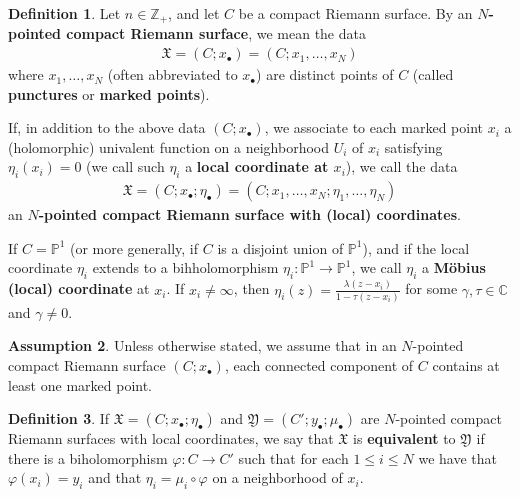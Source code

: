 \documentclass[11pt,b5paper,notitlepage]{article}
\theoremstyle{definition}
\newtheorem{df}{Definition}[section]
\newtheorem{ass}[df]{Assumption}
\theoremstyle{plain}
\newcommand{\fk}{\mathfrak}
\newcommand{\blt}{\bullet}
\newcommand{\Cbb}{\mathbb C}
\newcommand{\Zbb}{\mathbb Z}
\newcommand{\Pbb}{\mathbb P}
\numberwithin{equation}{section}
\begin{document}
\begin{df}
Let $n\in\Zbb_+$, and let $C$ be a compact Riemann surface. By an \textbf{$N$-pointed compact Riemann surface}, we mean the data
\begin{align*}
\fk X=(C;x_\blt)=(C;x_1,\dots,x_N)
\end{align*}
where $x_1,\dots,x_N$ (often abbreviated to $x_\blt$) are distinct points of $C$ (called \textbf{punctures} or \textbf{marked points}).

If, in addition to the above data $(C;x_\blt)$, we associate to each marked point $x_i$ a  (holomorphic) univalent function on a neighborhood $U_i$ of $x_i$ satisfying $\eta_i(x_i)=0$ (we call such $\eta_i$ a \textbf{local coordinate at $x_i$}), we call the data
\begin{align*}
\fk X=(C;x_\blt;\eta_\blt)=(C;x_1,\dots,x_N;\eta_1,\dots,\eta_N)
\end{align*}
an \textbf{$N$-pointed compact Riemann surface with (local) coordinates}.

If $C=\Pbb^1$ (or more generally, if $C$ is a disjoint union of $\Pbb^1$), and if the local coordinate $\eta_i$ extends to a bihholomorphism $\eta_i:\Pbb^1\rightarrow\Pbb^1$, we call $\eta_i$ a \textbf{M\"obius (local) coordinate} at $x_i$. If $x_i\neq\infty$, then $\eta_i(z)=\frac{\lambda(z-x_i)}{1-\tau(z-x_i)}$ for some $\gamma,\tau\in\Cbb$ and $\gamma\neq 0$.  \hfill\qedsymbol
\end{df}

\begin{ass}\label{lb7}
Unless otherwise stated, we assume that in an $N$-pointed compact Riemann surface $(C;x_\blt)$,  each connected component of $C$ contains at least one marked point.
\end{ass}


\begin{df}
If $\fk X=(C;x_\blt;\eta_\blt)$ and $\fk Y=(C';y_\blt;\mu_\blt)$ are $N$-pointed compact Riemann surfaces with local coordinates, we say that $\fk X$ is \textbf{equivalent} to $\fk Y$ if there is a biholomorphism $\varphi:C\rightarrow C'$ such that for each $1\leq i\leq N$ we have that $\varphi(x_i)=y_i$ and that $\eta_i=\mu_i\circ\varphi$ on a neighborhood of $x_i$.
\end{df}
\end{document}
